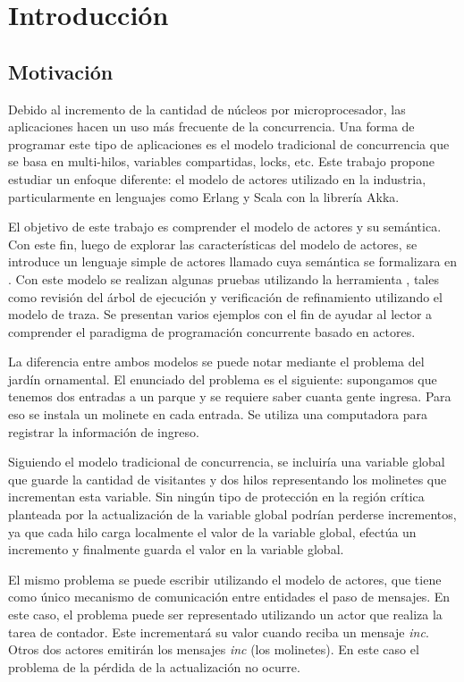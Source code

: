\chapter{Introducción}

\section{Motivación}

Debido al incremento de la cantidad de núcleos por microprocesador, las aplicaciones hacen un uso más frecuente de la concurrencia. Una forma de programar este tipo de aplicaciones es el modelo tradicional de concurrencia que se basa en multi-hilos, variables compartidas, locks, etc. Este trabajo propone estudiar un enfoque diferente: el modelo de actores utilizado en la industria, particularmente en lenguajes como Erlang\cite{Cesarini:2009:EP:1717841, Armstrong:1996:CPE:229883} y Scala\cite{scala-overview-tech-report} con la librería Akka\cite{Wyatt:2013:AC:2663429}. 

El objetivo de este trabajo es comprender el modelo de actores y su semántica. Con este fin, luego de explorar las características del modelo de actores, se introduce un lenguaje simple de actores llamado \SAL cuya semántica se formalizara en \CSP. Con este modelo se realizan algunas pruebas utilizando la herramienta \FDR, tales como revisión del árbol de ejecución y verificación de refinamiento utilizando el modelo de traza. Se presentan varios ejemplos con el fin de ayudar al lector a comprender el paradigma de programación concurrente basado en actores.

La diferencia entre ambos modelos se puede notar mediante el problema del jardín ornamental. El enunciado del problema es el siguiente: supongamos que tenemos dos entradas a un parque y se requiere saber cuanta gente ingresa. Para eso se instala un molinete en cada entrada. Se utiliza una computadora para registrar la información de ingreso.

Siguiendo el modelo tradicional de concurrencia, se incluiría una variable global que guarde la cantidad de visitantes y dos hilos representando los molinetes que incrementan esta variable. Sin ningún tipo de protección en la región crítica planteada por la actualización de la variable global podrían perderse incrementos, ya que cada hilo carga localmente el valor de la variable global, efectúa un incremento y finalmente guarda el valor en la variable global. 

El mismo problema se puede escribir utilizando el modelo de actores, que tiene como único mecanismo de comunicación entre entidades el paso de mensajes. En este caso, el problema puede ser representado utilizando un actor que realiza la tarea de contador. Este incrementará su valor cuando reciba un mensaje \emph{inc}. Otros dos actores emitirán los mensajes \emph{inc} (los molinetes). En este caso el problema de la pérdida de la actualización no ocurre.

